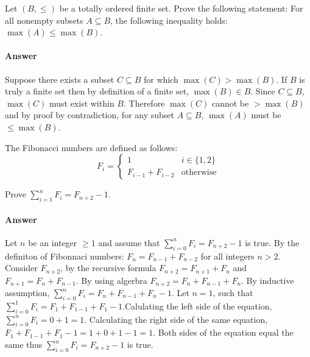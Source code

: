 \documentclass{article}
\begin{document}
Let $(B,\leq)$ be a totally ordered finite set. Prove the following
statement: For all nonempty subsets $A \subseteq B$, the following inequality
holds: $\max(A) \leq \max(B)$.

\paragraph{Answer}

Suppose there exists a subset $C \subseteq B$ for which $\max(C) > \max(B)$. If $B$ is truly a finite set then by definition of a finite set, $\max(B) \in B$. Since $C \subseteq B$, $\max(C)$ must exist within $B$. Therefore $\max(C)$ cannot be $> \max(B)$ and by proof by contradiction, for any subset $A \subseteq B$, $\max(A)$ must be $\leq \max(B)$.

 

The Fibonacci numbers are defined as follows:
$$
    F_i = \begin{cases}
            1 & i \in \{1,2\} \\
            F_{i-1}+F_{i-2} & \text{otherwise}
          \end{cases}
$$

Prove $\sum_{i=1}^n F_i = F_{n+2}-1$.

\paragraph{Answer}

Let $n$ be an integer $\geq 1$ and assume that $\sum_{i=0}^n F_i = F_{n+2}-1$ is true. By the definiton of Fibonnaci numbers: $F_n =F_{n-1}+F_{n-2}$ for all integers $n>2$. Consider $F_{n+2}$, by the recursive formula $F_{n+2}=F_{n+1}+F_n$ and $F_{n+1} =F_n+F_{n-1}$. By using algerbra $F_{n+2}=F_n+F_{n-1}+F_n$. By inductive assumption, $\sum_{i=0}^n F_i = F_n+F_{n-1}+F_n-1$. Let $n=1$, such that $\sum_{i=0}^1 F_i = F_1+F_{1-1}+F_1-1$.Calulating the left side of the equation,  $\sum_{i=0}^n F_i =0+1=1$. Calculating the right side of the same equation,  $F_1+F_{1-1}+F_1-1= 1+0+1-1=1$. Both sides of the equation equal the same thus  $\sum_{i=0}^n F_i = F_{n+2}-1$ is true.


 
\end{document}
